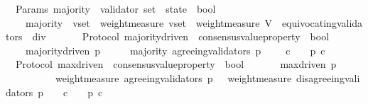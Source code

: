 \begin{isabellebody}
%
\isadelimproof
\isanewline
%
\endisadelimproof
\isanewline
\isanewline
{}\isamarkupfalse%
\ {\isacharparenleft}\ Params{\isacharparenright}\ majority\ {\isacharcolon}{\isacharcolon}\ {\isachardoublequoteopen}{\isacharparenleft}validator\ set\ {\isacharasterisk}\ state{\isacharparenright}\ {\isasymRightarrow}\ bool{\isachardoublequoteclose}\isanewline
\ \ \isanewline
\ \ \ \ {\isachardoublequoteopen}majority\ {\isacharequal}\ {\isacharparenleft}{\isasymlambda}{\isacharparenleft}v{\isacharunderscore}set{\isacharcomma}\ {\isasymsigma}{\isacharparenright}{\isachardot}\ {\isacharparenleft}weight{\isacharunderscore}measure\ v{\isacharunderscore}set\ {\isachargreater}\ {\isacharparenleft}weight{\isacharunderscore}measure\ {\isacharparenleft}V\ {\isacharminus}\ equivocating{\isacharunderscore}validators\ {\isasymsigma}{\isacharparenright}{\isacharparenright}\ div\ {}{\isacharparenright}{\isacharparenright}{\isachardoublequoteclose}\isanewline
\ \ \ \isanewline
\isanewline
{}\isamarkupfalse%
\ {\isacharparenleft}\ Protocol{\isacharparenright}\ majority{\isacharunderscore}driven\ {\isacharcolon}{\isacharcolon}\ {\isachardoublequoteopen}consensus{\isacharunderscore}value{\isacharunderscore}property\ {\isasymRightarrow}\ bool{\isachardoublequoteclose}\isanewline
\ \ \isanewline
\ \ \ \ {\isachardoublequoteopen}majority{\isacharunderscore}driven\ p\ {\isacharequal}\ {\isacharparenleft}{\isasymforall}\ {\isasymsigma}\ {\isasymin}\ {\isasymSigma}{\isachardot}\ majority\ {\isacharparenleft}agreeing{\isacharunderscore}validators\ {\isacharparenleft}p{\isacharcomma}\ {\isasymsigma}{\isacharparenright}{\isacharcomma}\ {\isasymsigma}{\isacharparenright}\ {\isasymlongrightarrow}\ {\isacharparenleft}{\isasymforall}\ c\ {\isasymin}\ {\isasymepsilon}\ {\isasymsigma}{\isachardot}\ p\ c{\isacharparenright}{\isacharparenright}{\isachardoublequoteclose}\isanewline
\isanewline
\isanewline
{}\isamarkupfalse%
\ {\isacharparenleft}\ Protocol{\isacharparenright}\ max{\isacharunderscore}driven\ {\isacharcolon}{\isacharcolon}\ {\isachardoublequoteopen}consensus{\isacharunderscore}value{\isacharunderscore}property\ {\isasymRightarrow}\ bool{\isachardoublequoteclose}\isanewline
\ \ \isanewline
\ \ \ \ {\isachardoublequoteopen}max{\isacharunderscore}driven\ p\ {\isacharequal}\isanewline
\ \ \ \ \ \ {\isacharparenleft}{\isasymforall}\ {\isasymsigma}\ {\isasymin}\ {\isasymSigma}{\isachardot}\ weight{\isacharunderscore}measure\ {\isacharparenleft}agreeing{\isacharunderscore}validators\ {\isacharparenleft}p{\isacharcomma}\ {\isasymsigma}{\isacharparenright}{\isacharparenright}\ {\isachargreater}\ weight{\isacharunderscore}measure\ {\isacharparenleft}disagreeing{\isacharunderscore}validators\ {\isacharparenleft}p{\isacharcomma}\ {\isasymsigma}{\isacharparenright}{\isacharparenright}\ {\isasymlongrightarrow}\ {\isacharparenleft}{\isasymforall}\ c\ {\isasymin}\ {\isasymepsilon}\ {\isasymsigma}{\isachardot}\ p\ c{\isacharparenright}{\isacharparenright}{\isachardoublequoteclose}\isanewline

\end{isabellebody}
